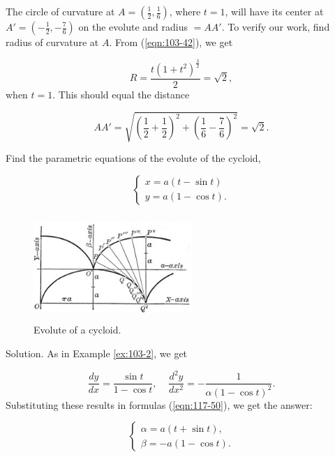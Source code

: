 \begin{example}
{The circle of curvature at $A= (\frac{1}{2}, \frac{1}{6})$, 
where $t = 1$, will have its center at 
$A'= (-\frac{1}{2}, -\frac{7}{6})$ on the evolute and radius 
$= AA'$. To verify our work, find radius of curvature at $A$. From 
(\ref{eqn:103-42}), %
we get

\[
R = \frac{t(1 + t^2)^{\frac{3}{2}}}{2} = \sqrt{2}, 
\]
when $t= 1$.
This should equal the distance

\[
    AA' 
= \sqrt{(\frac{1}{2} + \frac{1}{2})^2 +
(\frac{1}{6} - \frac{7}{6})^2} = \sqrt{2}.
\]
}
\end{example}

\begin{example}
\label{ex:118-cycloid}
{\rm
Find the parametric equations of the evolute of the cycloid,

\begin{equation}
\label{eqn:119C2}
\begin{cases} 
x = a(t - \sin t) \\ 
y = a(1 - \cos t).
\end{cases}
\end{equation}

\begin{figure}[h!]
\begin{minipage}{\textwidth}
\begin{center}
\includegraphics[height=4cm,width=6cm]{evolute-of-cycloid.eps}
\end{center}
\end{minipage}
\caption{Evolute of a cycloid.}
\label{fig:evolute-of-cycloid}
\end{figure}

\noindent
Solution. As in Example \ref{ex:103-2}, %
we get

\[
  	\frac{dy}{dx} = \frac{\sin t}{1 - \cos t}, 
\ \ \ \ \ 
\frac{d^2 y}{dx^2} = -\frac{1}{\alpha (1 - \cos t)^2}.
\]
Substituting these results in formulas (\ref{eqn:117-50}), %
we get the answer:

\begin{equation}
\label{eqn:119D}
\begin{cases} 
\alpha = a(t + \sin t), \\ 
\beta = -a(1 - \cos t).
\end{cases} 
\end{equation}
}
\end{example}


